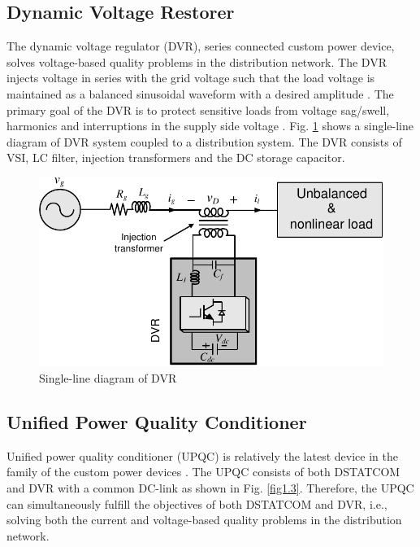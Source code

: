  
 \subsection{Dynamic Voltage Restorer} 
 
 The dynamic voltage regulator (DVR), series connected custom power device, solves voltage-based quality problems in the distribution network. The DVR injects voltage in series with the grid voltage such that the load voltage is maintained as a balanced sinusoidal waveform with a desired amplitude \cite{moran1989line}. The primary goal of the DVR is to protect sensitive loads from voltage sag/swell, harmonics and interruptions in the supply side voltage  \cite{387140,woodley1999experience}. Fig. \ref{fig1.2} shows a single-line diagram of DVR system coupled to a distribution system. The DVR consists of VSI, LC filter, injection transformers and the DC storage capacitor.  
 
\begin{figure}[ht]
	\centering
		\includegraphics[scale=1]{figures/Chapter_1_2/fig1p2}
	\caption{Single-line diagram of DVR}
	\label{fig1.2}
\end{figure}

\vspace*{0.3cm}
\subsection{Unified Power Quality Conditioner}
 Unified power quality conditioner (UPQC) is relatively the latest device in the family of the custom power devices \cite{662847,chen2000unified,tolbert2000multilevel,mwinyiwiwa2000multiterminal,ghosh2001unified}.  The UPQC consists of both DSTATCOM and DVR with a common DC-link as shown in Fig. \ref{fig1.3}. Therefore, the UPQC can simultaneously fulfill the objectives of both DSTATCOM and DVR, i.e., solving both the current and voltage-based quality problems in the distribution network.


